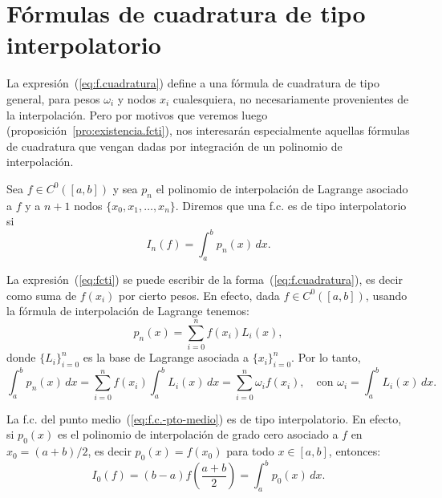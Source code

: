 \section{Fórmulas de cuadratura de tipo interpolatorio}
\label{sec:cuadratura-interpolatorio}

La expresión~(\ref{eq:f.cuadratura}) define a una fórmula de
cuadratura de tipo general, para pesos $\omega_i$ y nodos $x_i$
cualesquiera, no necesariamente provenientes de la interpolación.
Pero por motivos que veremos luego
(proposición~\ref{pro:existencia.fcti}), nos interesarán especialmente
aquellas fórmulas de cuadratura que vengan dadas por integración de un
polinomio de interpolación.
\begin{definition}
  Sea $f\in C^0([a,b])$ y sea $p_n$ el polinomio de interpolación de
  Lagrange asociado a $f$ y a $n+1$ nodos
  $\{x_0,x_1,\dots,x_n\}$. Diremos que una f.c. es de tipo
  interpolatorio si
  \begin{equation}
    \label{eq:fcti}
    I_n(f)=\int_a^b p_n(x)\, dx.
  \end{equation}
  \label{def:fcti}
\end{definition}

La expresión~(\ref{eq:fcti}) se puede escribir de la
forma~(\ref{eq:f.cuadratura}), es decir como suma de $f(x_i)$ por
cierto pesos. En efecto, dada $f\in C^0([a,b])$,
usando la fórmula de interpolación de Lagrange tenemos:
\begin{equation*}
  p_n(x)=\sum_{i=0}^n f(x_i) L_i(x),
\end{equation*}
donde $\{L_i\}_{i=0}^n$ es la base de Lagrange asociada a
$\{x_i\}_{i=0}^n$. Por lo tanto,
\begin{equation*}
  \int_a^bp_n(x)\,dx = \sum_{i=0}^n f(x_i) \int_a^b L_i(x)\,dx
  =\sum_{i=0}^n \omega_i f(x_i), \quad \text{con } \omega_i=\int_a^b L_i(x)\,dx.
\end{equation*}

\begin{example}
  \label{ex:formula-pto-medio-interpol}
  La f.c. del punto medio~(\ref{eq:f.c.-pto-medio}) es de tipo
  interpolatorio. En efecto, si $p_0(x)$ es el polinomio de
  interpolación de grado cero asociado a $f$ en $x_0=(a+b)/2$, es
  decir $p_0(x)=f(x_0)$ para todo $x\in[a,b]$, entonces:
  \begin{equation*}
    I_0(f) = (b-a)f\left(\frac{a+b}{2}\right) = \int_a^b p_0(x)\,dx.
  \end{equation*}
\end{example}

